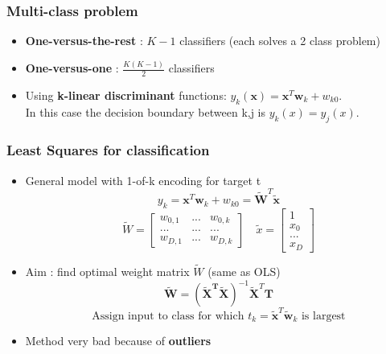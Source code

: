 \documentclass[12pt]{article} %
\begin{document}
\subsubsection{Multi-class problem}
\begin{itemize}
\item \textbf{One-versus-the-rest} : $K-1$ classifiers (each solves a 2 class problem)
\item \textbf{One-versus-one} : $\frac{K(K-1)}{2}$ classifiers
\item  Using \textbf{k-linear discriminant} functions: $y_k(\bm{x}) = \bm{x}^T \bm{w}_k + w_{k0} $.\\
In this case the decision boundary between k,j is $y_k(x) = y_j(x)$.
\end{itemize}


\subsubsection{Least Squares for classification}
\begin{itemize}
\item General model with 1-of-k encoding for target t
$$ y_k = \bm{x}^T \bm{w}_k + w_{k0} = \bm{\tilde{W}}^T \bm{\tilde{x}}$$
$$ \tilde{W} = \begin{bmatrix}
w_{0,1} & ... & w_{0,k} \\
... & ... & ... \\
w_{D,1} & ... & w_{D,k}
\end{bmatrix}  \quad \tilde{x} = \begin{bmatrix}
1 \\ x_0 \\ ... \\x_D
\end{bmatrix} $$
\item Aim : find optimal weight matrix $\tilde{W}$ (same as OLS)
$$ \bm{\tilde{W}} = (\bm{\tilde{X}^T \tilde{X}})^{-1} \bm{\tilde{X}}^T \bm{T} $$
$$ \text{Assign input to class for which }t_k = \tilde{\bm{x}}^T \tilde{\bm{w}}_k \text{ is largest}$$

\item Method very bad because of \textbf{outliers}
\end{itemize}
\end{document}
